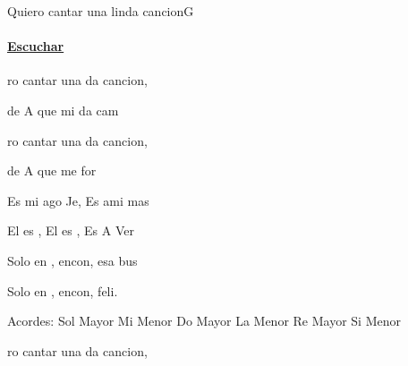 \documentclass[12pt, spanish]{book}
\begin{document}
    \begin{song}{Quiero cantar una linda cancion}{G}
        {} %
        {}
        {} %
        {}

        \ifChordBk
        \paragraph{\mbox{}\hfill\protect\href{https://open.spotify.com/intl-es/track/0doGqmo0qcAftYW74miq9s}{Escuchar}\mbox{}\hfill}
        \fi

        \begin{SBOpGroup}
            ro cantar una da cancion,

            de A que mi da cam

            ro cantar una da cancion,

            de A que me for
        \end{SBOpGroup}

        \begin{SBChorus}
            Es mi ago Je, Es  ami mas 

            El es , El es , Es A  Ver

            Solo en , encon, esa   bus

            Solo en , encon,  feli.
        \end{SBChorus}

        \ifChordBk
        \begin{SBOpGroup}
            Acordes:
            \upchord{\G}\qquad Sol Mayor \hfill
            \upchord{\Em}Mi Menor \hfill\null\break
            \upchord{\C}\qquad Do Mayor \hfill
            \upchord{\Am}\qquad La Menor \hfill\null\break
            \upchord{\D}\qquad Re Mayor \hfill
            \upchord{\Bm}\qquad Si Menor \hfill\null\break
        \end{SBOpGroup}
        \fi
        \begin{SBExtraKeys}{

            \begin{SBOpGroup}
                ro cantar una da cancion,


\end{SBOpGroup}}
\end{SBExtraKeys}
\end{song}
\end{document}
